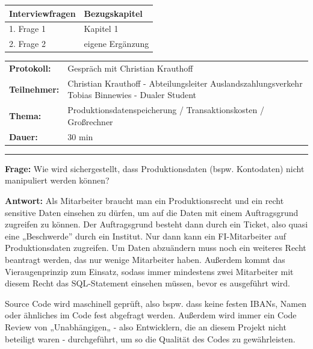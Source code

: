 
\label{Anhang 1 - Interviewleitfaden für das Interview mit Christian Krauthoff}

\begin{tabular}{|p{10cm}|p{4cm}|}
    \hline
    \textbf{Interviewfragen} & \textbf{Bezugskapitel} \\
    \hline
    1. Frage 1 & Kapitel 1 \\
    \hline
    2. Frage 2 & eigene Ergänzung \\
    \hline
    \end{tabular}

\newpage

\label{appendix: Anhang 3}

\begin{tabular}{p{2.5 cm}p{11.8 cm}}
\textbf{Protokoll:} & Gespräch mit Christian Krauthoff \\
\textbf{Teilnehmer:} & Christian Krauthoff - Abteilungsleiter Auslandszahlungsverkehr \break Tobias Binnewies - Dualer Student \\
\textbf{Thema:} & Produktionsdatenspeicherung / Transaktionskosten / Großrechner \\
\textbf{Dauer:} & 30 min
\end{tabular}
\bigbreak
\noindent\rule[1ex]{\textwidth}{1pt} %
\bigbreak

\textbf{Frage:} 
\label{i1:f1}
Wie wird sichergestellt, dass Produktionsdaten (bspw. Kontodaten) nicht manipuliert werden können?


\textbf{Antwort:} 
Als Mitarbeiter braucht man ein Produktionsrecht und ein recht sensitive Daten einsehen zu dürfen, um auf die Daten mit einem Auftragsgrund zugreifen zu können. Der Auftragsgrund besteht dann durch ein Ticket, also quasi eine „Beschwerde” durch ein Institut.
Nur dann kann ein FI-Mitarbeiter auf Produktionsdaten zugreifen.
Um Daten abzuändern muss noch ein weiteres Recht beantragt werden, das nur wenige Mitarbeiter haben.
Außerdem kommt das Vieraugenprinzip zum Einsatz, sodass immer mindestens zwei Mitarbeiter mit diesem Recht das SQL-Statement einsehen müssen, bevor es ausgeführt wird.

Source Code wird maschinell geprüft, also bspw. dass keine festen IBANs, Namen oder ähnliches im Code fest abgefragt werden.
Außerdem wird immer ein Code Review von „Unabhängigen„ - also Entwicklern, die an diesem Projekt nicht beteiligt waren - durchgeführt, um so die Qualität des Codes zu gewährleisten.

